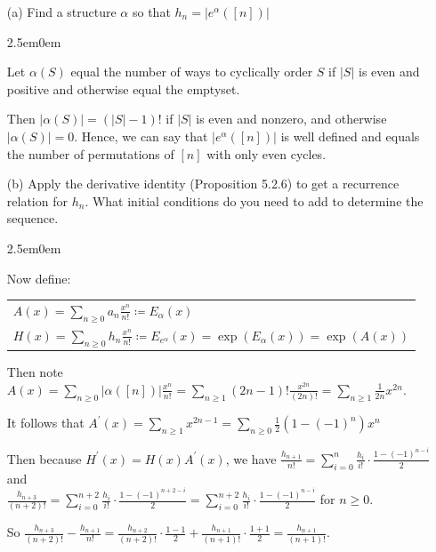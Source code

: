 \documentclass{book}
\newcommand{\exOne}{%
   \color{Purple}%
   \fontsize{13}{15}\selectfont%
}
\newenvironment{myIndent}{%
   \begin{adjustwidth}{2.5em}{0em}%
}{%
   \end{adjustwidth}%
}
\newcommand{\retTwo}{\hfill\bigbreak}
\begin{document}
\begin{enumerate}
	\item[(a)] Find a structure $\alpha$ so that $h_n = |e^\alpha([n])|$
	
	\begin{myIndent}\exOne
		Let $\alpha(S)$ equal the number of ways to cyclically order $S$ if $|S|$ is even and\\ positive and otherwise equal the emptyset.\retTwo

		Then $|\alpha(S)| = (|S| - 1)!$ if $|S|$ is even and nonzero, and otherwise\\ $|\alpha(S)| = 0$. Hence, we can say that $|e^\alpha([n])|$ is well defined and equals\\ the number of permutations of $[n]$ with only even cycles.\retTwo
	\end{myIndent}

	\item[(b)] Apply the derivative identity (Proposition 5.2.6) to get a recurrence relation for $h_n$. What initial conditions do you need to add to determine the sequence.
	
	\begin{myIndent}\exOne
		Now define:
		
		{\centering\begin{tabular}{l}
			$A(x) = \sum\limits_{n \geq 0}a_n \frac{x^n}{n!} \coloneq E_\alpha(x)$\\
			$H(x) = \sum\limits_{n \geq 0} h_n\frac{x^n}{n!} \coloneq E_{e^\alpha}(x) = \exp(E_\alpha(x)) = \exp(A(x))$
		\end{tabular}\retTwo\par}

		Then note $A(x) = \sum\limits_{n \geq 0}|\alpha([n])|\frac{x^n}{n!} = \sum\limits_{n \geq 1}(2n - 1)!\frac{x^{2n}}{(2n)!} = \sum\limits_{n \geq 1}\frac{1}{2n}x^{2n}$.\retTwo

		It follows that $A^\prime(x) = \sum\limits_{n \geq 1}x^{2n-1} = \sum\limits_{n \geq 0}\frac{1}{2}(1 - (-1)^{n})x^n$\retTwo

		Then because $H^\prime(x) = H(x)A^\prime(x)$, we have $\frac{h_{n+1}}{n!} = \sum\limits_{i=0}^n \frac{h_i}{i!}\cdot\frac{1 - (-1)^{n-i}}{2}$ and\\ [-8pt] $\frac{h_{n+3}}{(n+2)!} = \sum\limits_{i=0}^{n+2} \frac{h_i}{i!}\cdot\frac{1 - (-1)^{n+2-i}}{2} = \sum\limits_{i=0}^{n+2} \frac{h_i}{i!}\cdot\frac{1 - (-1)^{n-i}}{2}$ for $n \geq 0$.\retTwo

		So $\frac{h_{n+3}}{(n+2)!} - \frac{h_{n+1}}{n!} = \frac{h_{n+2}}{(n+2)!}\cdot\frac{1-1}{2} + \frac{h_{n+1}}{(n+1)!}\cdot\frac{1+1}{2} = \frac{h_{n+1}}{(n+1)!}$.\retTwo


\end{myIndent}
\end{enumerate}
\end{document}
